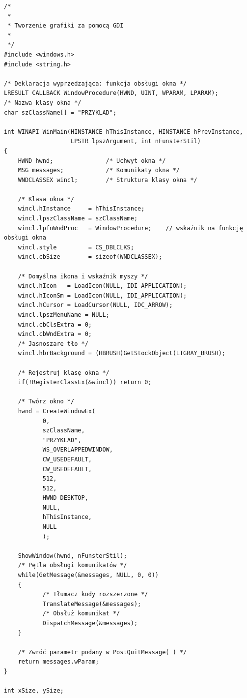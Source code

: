 \begin{scriptsize}
\begin{verbatim}
/*
 *
 * Tworzenie grafiki za pomocą GDI
 *
 */
#include <windows.h>
#include <string.h>

/* Deklaracja wyprzedzająca: funkcja obsługi okna */
LRESULT CALLBACK WindowProcedure(HWND, UINT, WPARAM, LPARAM);
/* Nazwa klasy okna */
char szClassName[] = "PRZYKLAD";

int WINAPI WinMain(HINSTANCE hThisInstance, HINSTANCE hPrevInstance, 
                   LPSTR lpszArgument, int nFunsterStil)
{
    HWND hwnd;               /* Uchwyt okna */
    MSG messages;            /* Komunikaty okna */
    WNDCLASSEX wincl;        /* Struktura klasy okna */

    /* Klasa okna */
    wincl.hInstance     = hThisInstance;
    wincl.lpszClassName = szClassName;
    wincl.lpfnWndProc   = WindowProcedure;    // wskaźnik na funkcję obsługi okna  
    wincl.style         = CS_DBLCLKS;                 
    wincl.cbSize        = sizeof(WNDCLASSEX);

    /* Domyślna ikona i wskaźnik myszy */
    wincl.hIcon   = LoadIcon(NULL, IDI_APPLICATION);
    wincl.hIconSm = LoadIcon(NULL, IDI_APPLICATION);
    wincl.hCursor = LoadCursor(NULL, IDC_ARROW);
    wincl.lpszMenuName = NULL; 
    wincl.cbClsExtra = 0;   
    wincl.cbWndExtra = 0;   
    /* Jasnoszare tło */
    wincl.hbrBackground = (HBRUSH)GetStockObject(LTGRAY_BRUSH);

    /* Rejestruj klasę okna */
    if(!RegisterClassEx(&wincl)) return 0;

    /* Twórz okno */
    hwnd = CreateWindowEx(
           0,                   
           szClassName,         
           "PRZYKLAD",       
           WS_OVERLAPPEDWINDOW, 
           CW_USEDEFAULT,       
           CW_USEDEFAULT,       
           512,                 
           512,                 
           HWND_DESKTOP,        
           NULL,                
           hThisInstance,       
           NULL                 
           );

    ShowWindow(hwnd, nFunsterStil);
    /* Pętla obsługi komunikatów */
    while(GetMessage(&messages, NULL, 0, 0))
    {
           /* Tłumacz kody rozszerzone */
           TranslateMessage(&messages);
           /* Obsłuż komunikat */
           DispatchMessage(&messages);
    }

    /* Zwróć parametr podany w PostQuitMessage( ) */
    return messages.wParam;
}

int xSize, ySize;


\end{verbatim}
\end{scriptsize}
